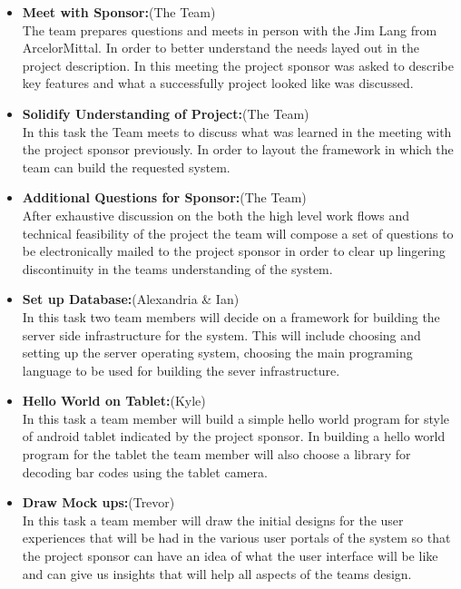 \documentclass[Letter,11pt]{article}
\begin{document}
		\begin{itemize}
			\item\textbf{Meet with Sponsor:}(The Team)\\
			The team prepares questions and meets in person with the Jim Lang from ArcelorMittal. In order to better understand the needs layed out in the project description. In this meeting the project sponsor was asked to describe key features and  what a successfully project looked like was discussed.
			
			\item \textbf{Solidify Understanding of Project:}(The Team)\\
			In this task the Team meets to discuss what was learned in the meeting with the project sponsor previously. In order to layout the framework in which the team can build the requested system.
			
			\item\textbf{Additional Questions for Sponsor:}(The Team)\\
			After exhaustive discussion on the both the high level work flows and technical feasibility of the project the team will compose a set of questions to be electronically mailed to the project sponsor in order to clear up lingering discontinuity in the teams understanding of the system.
			
			\item\textbf{Set up Database:}(Alexandria \& Ian)\\
			In this task two team members will decide on a framework for building the server side infrastructure for the system. This will include choosing and setting up the server operating system, choosing the main programing language to be used for building the sever infrastructure.
			
			\item\textbf{Hello World on Tablet:}(Kyle)\\
			In this task a team member will build a simple hello world program for style of android tablet indicated by the project sponsor. In building a hello world program for the tablet the team member will also choose a library for decoding bar codes using the tablet camera. 
			
			\item\textbf{Draw Mock ups:}(Trevor)\\
			In this task a team member will draw the initial designs for the user experiences that will be had in the various user portals of the system so that the project sponsor can have an idea of what the user interface will be like and can give us insights that will help all aspects of the teams design. 
			

\end{itemize}
\end{document}
